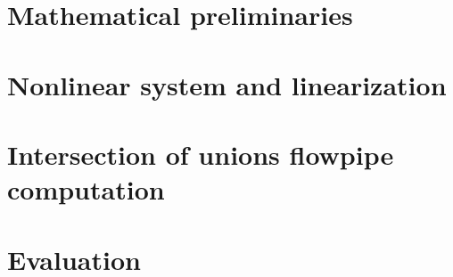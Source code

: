 \section{Mathematical preliminaries}

%
\section{Nonlinear system and linearization}

%
\section{Intersection of unions flowpipe computation}


\section{Evaluation}















